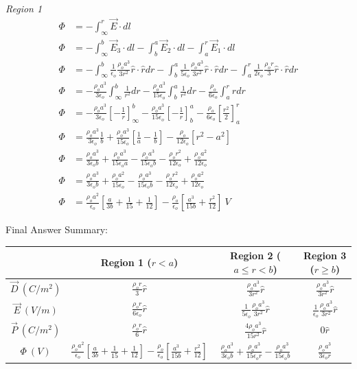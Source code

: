 \documentclass[12pt]{article}
\begin{document}
	
\textit{Region 1}	
	\begin{align*}
		\Phi &= -\int_{\infty}^{r} \vec{E} \cdot dl \\
		\Phi &= -\int_{\infty}^{b} \vec{E}_3 \cdot dl - \int_b^a \vec{E}_2 \cdot dl - \int_a^r \vec{E}_1 \cdot dl\\
		\Phi &= -\int_{\infty}^{b} \frac{1}{\epsilon_o} \frac{\rho_o a^3}{3 r^2} \hat{r} \cdot \hat{r} dr - \int_b^a \frac{1}{5 \epsilon_o} \frac{\rho_o a^3}{3 r^2} \hat{r} \cdot \hat{r} dr - \int_a^r \frac{1}{2 \epsilon_o} \frac{\rho_o r}{3} \hat{r} \cdot \hat{r} dr\\
		\Phi &= -\frac{\rho_o a^3}{3 \epsilon_o} \int_{\infty}^{b} \frac{1}{r^2} dr - \frac{\rho_o a^3}{15 \epsilon_o} \int_b^a \frac{1}{r^2} dr  - \frac{\rho_o}{6 \epsilon_o} \int_a^r r dr\\
		\Phi &= -\frac{\rho_o a^3}{3 \epsilon_o} \left[-\frac{1}{r}\right]_\infty^b - \frac{\rho_o a^3}{15 \epsilon_o} \left[-\frac{1}{r}\right]_b^a - \frac{\rho_o}{6 \epsilon_o} \left[\frac{r^2}{2}\right]_a^r\\
		\Phi &= \frac{\rho_o a^3}{3 \epsilon_o} \frac{1}{b} + \frac{\rho_o a^3}{15 \epsilon_o} \left[\frac{1}{a} - \frac{1}{b}\right] - \frac{\rho_o}{12 \epsilon_o} \left[r^2 - a^2\right]\\
		\Phi &= \frac{\rho_o a^3}{3 \epsilon_o b} + \frac{\rho_o a^3}{15 \epsilon_o a} - \frac{\rho_o a^3}{15 \epsilon_o b} - \frac{\rho_o r^2}{12 \epsilon_o} + \frac{\rho_o a^2}{12 \epsilon_o}\\
		\Phi &= \frac{\rho_o a^3}{3 \epsilon_o b} + \frac{\rho_o a^2}{15 \epsilon_o} - \frac{\rho_o a^3}{15 \epsilon_o b} - \frac{\rho_o r^2}{12 \epsilon_o} + \frac{\rho_o a^2}{12 \epsilon_o}\\
		\Phi &= \frac{\rho_o a^2}{\epsilon_o}\left[ \frac{a}{3b} + \frac{1}{15} + \frac{1}{12}\right] - \frac{\rho_o}{\epsilon_o}\left[\frac{a^3}{15b} + \frac{r^2}{12}\right]~V
	\end{align*}		

		
Final Answer Summary:
		
\begin{tabular}{| c | c | c | c |}
\hline
& Region 1 ($r<a$)& Region 2 ($a\leq r < b$)& Region 3 ($r\geq b$)\\ \hline
$\vec{D}~(C/m^2)$ & $\frac{\rho_o r}{3} \hat{r}$ & $\frac{\rho_o a^3}{3 r^2} \hat{r}$ & $\frac{\rho_o a^3}{3 r^2} \hat{r}$\\
$\vec{E}~(V/m)$ & $\frac{\rho_o r}{6 \epsilon_o} \hat{r}$ & $\frac{1}{5 \epsilon_o} \frac{\rho_o a^3}{3 r^2} \hat{r}$ & $\frac{1}{\epsilon_o} \frac{\rho_o a^3}{3 r^2} \hat{r}$\\
$\vec{P}~(C/m^2)$ & $\frac{\rho_o r}{6} \hat{r}$ & $\frac{4\rho_o a^3}{15 r^2} \hat{r}$ & $0 \hat{r}$\\
$\Phi~(V)$ &  $\frac{\rho_o a^2}{\epsilon_o}\left[ \frac{a}{3b} + \frac{1}{15} + \frac{1}{12}\right] - \frac{\rho_o}{\epsilon_o}\left[\frac{a^3}{15b} + \frac{r^2}{12}\right]$ & $\frac{\rho_o a^3}{3 \epsilon_o b} + \frac{\rho_o a^3}{15 \epsilon_o r} - \frac{\rho_o a^3}{15 \epsilon_o b}$ & $\frac{\rho_o a^3}{3\epsilon_o r}$\\ \hline
\end{tabular}
\end{document}
